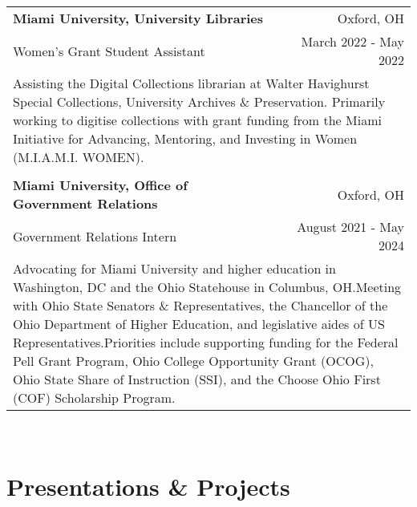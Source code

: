 \documentclass[letterpaper,8pt]{article} %
\begin{document}
{\begin{tabular*}{\linewidth}{@{\extracolsep{\fill}} lr }
\textbf{Miami University, University Libraries} & \footnotesize{Oxford, OH}\\
\footnotesize{Women's Grant Student Assistant} & \footnotesize{March 2022 - May 2022}\\
\multicolumn{2}{p{\linewidth}}{\footnotesize{Assisting the Digital Collections librarian at Walter Havighurst Special Collections, University Archives \& Preservation. Primarily working to digitise collections with grant funding from the Miami Initiative for Advancing, Mentoring, and Investing in Women (M.I.A.M.I. WOMEN).}}\\
\multicolumn{2}{c}{} \\

\textbf{Miami University, Office of Government Relations} & \footnotesize{Oxford, OH}\\
\footnotesize{Government Relations Intern} & \footnotesize{August 2021 - May 2024}\\
\multicolumn{2}{p{\linewidth}}{\footnotesize{Advocating for Miami University and higher education in Washington, DC and the Ohio Statehouse in Columbus, OH.\@ Meeting with Ohio State Senators \& Representatives, the Chancellor of the Ohio Department of Higher Education, and legislative aides of US Representatives.\@ Priorities include supporting funding for the Federal Pell Grant Program, Ohio College Opportunity Grant (OCOG), Ohio State Share of Instruction (SSI), and the Choose Ohio First (COF) Scholarship Program.}}\\
\end{tabular*}}\\

\section{Presentations \& Projects}
\end{document}
